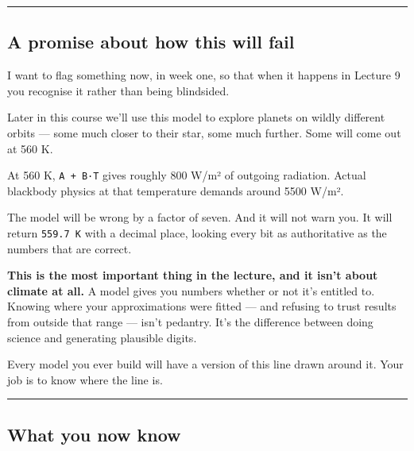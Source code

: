 \begin{center}\rule{0.5\linewidth}{0.5pt}\end{center}

\subsection{A promise about how this will
fail}\label{a-promise-about-how-this-will-fail}

I want to flag something now, in week one, so that when it happens in
Lecture 9 you recognise it rather than being blindsided.

Later in this course we'll use this model to explore planets on wildly
different orbits --- some much closer to their star, some much further.
Some will come out at 560 K.

At 560 K, \texttt{A\ +\ B·T} gives roughly 800 W/m² of outgoing
radiation. Actual blackbody physics at that temperature demands around
5500 W/m².

The model will be wrong by a factor of seven. And it will not warn you.
It will return \texttt{559.7\ K} with a decimal place, looking every bit
as authoritative as the numbers that are correct.

\textbf{This is the most important thing in the lecture, and it isn't
about climate at all.} A model gives you numbers whether or not it's
entitled to. Knowing where your approximations were fitted --- and
refusing to trust results from outside that range --- isn't pedantry.
It's the difference between doing science and generating plausible
digits.

Every model you ever build will have a version of this line drawn around
it. Your job is to know where the line is.

\begin{center}\rule{0.5\linewidth}{0.5pt}\end{center}

\subsection{What you now know}\label{what-you-now-know}

